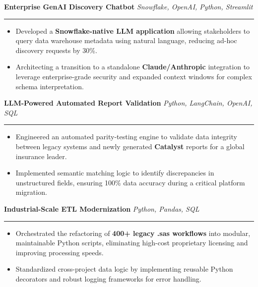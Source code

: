 \vspace{0.3cm}

\noindent \textbf{Enterprise GenAI Discovery Chatbot} \hfill \textit{Snowflake, OpenAI, Python, Streamlit}
\hrule  
\begin{itemize}[leftmargin=0.5cm, nosep]
    \item Developed a \textbf{Snowflake-native LLM application} allowing stakeholders to query data warehouse metadata using natural language, reducing ad-hoc discovery requests by 30\%.
    \item Architecting a transition to a standalone \textbf{Claude/Anthropic} integration to leverage enterprise-grade security and expanded context windows for complex schema interpretation.
\end{itemize}

\vspace{0.3cm}

\noindent \textbf{LLM-Powered Automated Report Validation} \hfill \textit{Python, LangChain, OpenAI, SQL}
\hrule
\begin{itemize}[leftmargin=0.5cm, nosep]
    \item Engineered an automated parity-testing engine to validate data integrity between legacy systems and newly generated \textbf{Catalyst} reports for a global insurance leader.
    \item Implemented semantic matching logic to identify discrepancies in unstructured fields, ensuring 100\% data accuracy during a critical platform migration.
\end{itemize}

\vspace{0.3cm}

\noindent \textbf{Industrial-Scale ETL Modernization} \hfill \textit{Python, Pandas, SQL}
\hrule
\begin{itemize}[leftmargin=0.5cm, nosep]
    \item Orchestrated the refactoring of \textbf{400+ legacy .sas workflows} into modular, maintainable Python scripts, eliminating high-cost proprietary licensing and improving processing speeds.
    \item Standardized cross-project data logic by implementing reusable Python decorators and robust logging frameworks for error handling.
\end{itemize}



